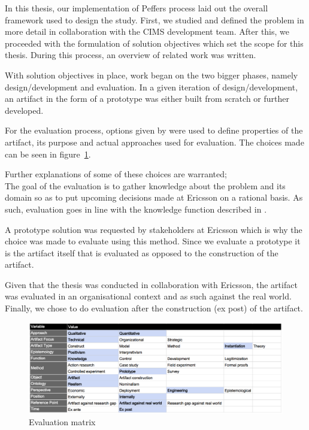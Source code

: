In this thesis, our implementation of Peffers process laid out the overall framework used to design the study. First, we studied and defined the problem in more detail in collaboration with the CIMS development team. After this, we proceeded with the formulation of solution objectives which set the scope for this thesis. During this process, an overview of related work was written.

With solution objectives in place, work began on the two bigger phases, namely design/development and evaluation. In a given iteration of design/development, an artifact in the form of a prototype was either built from scratch or further developed.

For the evaluation process, options given by \cite{DesignEval} were used to define properties of the artifact, its purpose and actual approaches used for evaluation. The choices made can be seen in figure~\ref{fig:matrix}.

Further explanations of some of these choices are warranted;\\
The goal of the evaluation is to gather knowledge about the problem and its domain so as to put upcoming decisions made at Ericsson on a rational basis. As such, evaluation goes in line with the knowledge function described in \cite{DesignEval}.

A prototype solution was requested by stakeholders at Ericsson which is why the choice was made to evaluate using this method. Since we evaluate a prototype it is the artifact itself that is evaluated as opposed to the construction of the artifact.

Given that the thesis was conducted in collaboration with Ericsson, the artifact was evaluated in an organisational context and as such against the real world. Finally, we chose to do evaluation after the construction (ex post) of the artifact.

\begin{figure}[h!]
\centering
\includegraphics[width=0.7\pdfpagewidth]{figure/eval.png}
\caption{Evaluation matrix}
\label{fig:matrix}
\end{figure}

